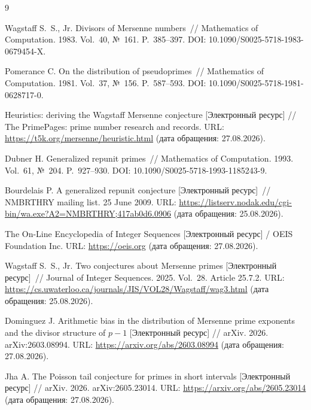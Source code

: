 \documentclass[11pt,a4paper]{article}
\theoremstyle{plain}
\theoremstyle{remark}
\begin{document}
\renewcommand{\refname}{Список источников}
\begin{thebibliography}{9}

 Wagstaff S.~S., Jr. Divisors of Mersenne numbers~//
Mathematics of Computation. 1983. Vol.~40, №~161. P.~385--397.
DOI: 10.1090/S0025-5718-1983-0679454-X.

 Pomerance C. On the distribution of pseudoprimes~//
Mathematics of Computation. 1981. Vol.~37, №~156. P.~587--593.
DOI: 10.1090/S0025-5718-1981-0628717-0.

 Heuristics: deriving the Wagstaff Mersenne conjecture
[Электронный ресурс] // The PrimePages: prime number research and records.
URL: \url{https://t5k.org/mersenne/heuristic.html} (дата обращения: 27.08.2026).

 Dubner H. Generalized repunit primes~//
Mathematics of Computation. 1993. Vol.~61, №~204. P.~927--930.
DOI: 10.1090/S0025-5718-1993-1185243-9.

 Bourdelais P. A generalized repunit conjecture
[Электронный ресурс]~// NMBRTHRY mailing list. 25 June 2009.
URL: \url{https://listserv.nodak.edu/cgi-bin/wa.exe?A2=NMBRTHRY;417ab0d6.0906}
(дата обращения: 25.08.2026).

 The On-Line Encyclopedia of Integer Sequences
[Электронный ресурс] / OEIS Foundation Inc.
URL: \url{https://oeis.org} (дата обращения: 27.08.2026).

 Wagstaff S.~S., Jr. Two conjectures about Mersenne primes
[Электронный ресурс]~// Journal of Integer Sequences. 2025. Vol.~28.
Article 25.7.2.
URL: \url{https://cs.uwaterloo.ca/journals/JIS/VOL28/Wagstaff/wag3.html}
(дата обращения: 25.08.2026).

 Dominguez J. Arithmetic bias in the distribution of Mersenne
prime exponents and the divisor structure of $p-1$ [Электронный ресурс] // arXiv.
2026. arXiv:2603.08994. URL: \url{https://arxiv.org/abs/2603.08994}
(дата обращения: 27.08.2026).

 Jha A. The Poisson tail conjecture for primes in short intervals
[Электронный ресурс] // arXiv. 2026. arXiv:2605.23014.
URL: \url{https://arxiv.org/abs/2605.23014} (дата обращения: 27.08.2026).


\end{thebibliography}
\end{document}
